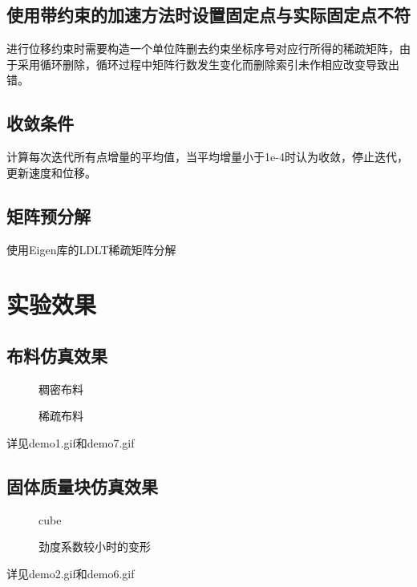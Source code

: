 \documentclass[14pt]{scrartcl} %
\begin{document}
\subsection{使用带约束的加速方法时设置固定点与实际固定点不符}
进行位移约束时需要构造一个单位阵删去约束坐标序号对应行所得的稀疏矩阵，由于采用循环删除，循环过程中矩阵行数发生变化而删除索引未作相应改变导致出错。

\subsection{收敛条件}
计算每次迭代所有点增量的平均值，当平均增量小于1e-4时认为收敛，停止迭代，更新速度和位移。

\subsection{矩阵预分解}
使用Eigen库的LDLT稀疏矩阵分解

\pagebreak

\section{实验效果}

\subsection{布料仿真效果}
\begin{figure}[h] %
	\centering
	\caption{稠密布料}
\end{figure}
\begin{figure}[h] %
	\centering
	\caption{稀疏布料}
\end{figure}

详见demo1.gif和demo7.gif
\pagebreak
\subsection{固体质量块仿真效果}
\begin{figure}[h] %
	\centering
	\caption{cube}
\end{figure}
\begin{figure}[h] %
	\centering
	\caption{劲度系数较小时的变形}
\end{figure}
详见demo2.gif和demo6.gif
\end{document}
